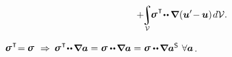 \begin{multline*}
\begin{gathered}
+ \hspace{-0.3ex}
\scalebox{0.9}{$\displaystyle\integral\displaylimits_{\mathcal{V}}$} \hspace{-0.3ex}
\linearstress^{\hspace{.12ex}\T} \hspace{-0.4ex} \dotdotp \hspace{-0.1ex} \boldnabla \hspace{.1ex} ( \bm{u}' \hspace{-0.4ex} - \hspace{-0.1ex} \bm{u} ) \hspace{.2ex} d\mathcal{V}
.
\end{gathered}\hspace{-1em}
\end{multline*}

\vspace{-0.3em}\noindent
{}  ${\linearstress^{\hspace{.12ex}\T} \hspace{-0.5ex} = \hspace{-0.1ex} \linearstress}$ ${\hspace{.4ex}\Rightarrow\hspace{.2ex}}$ ${\linearstress^{\hspace{.12ex}\T} \hspace{-0.4ex} \dotdotp \hspace{-0.2ex} \boldnabla \bm{a} = \linearstress \dotdotp \hspace{-0.2ex} \boldnabla \bm{a} = \linearstress \dotdotp \hspace{-0.2ex} \boldnabla \bm{a}^{\mathsf{S}} \hspace{.8ex}\forall \bm{a}}$.
\textcolor{magenta}{}

